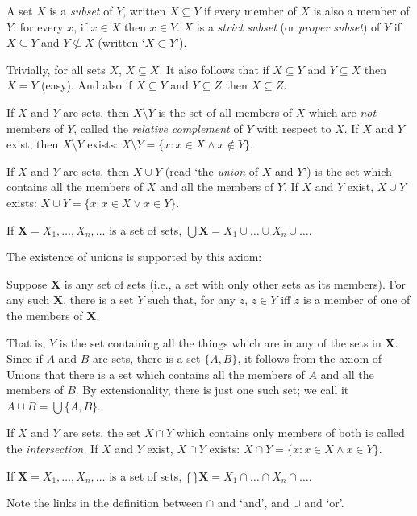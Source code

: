 \begin{definition}[Subset] A set $X$ is a {\em subset} of $Y$, written
   $X \subseteq Y$ if every
    member of $X$ is also a member of $Y$: for every $x$, if $x \in X$
    then $x \in Y$. $X$ is a {\em strict subset} (or {\em proper
    subset}) of $Y$ if $X
    \subseteq Y$ and $Y \not\subseteq X$ (written `$X \subset
Y$').\end{definition}
Trivially, for all sets $X$, $X\subseteq X$. It also follows that if $X \subseteq Y$ and $Y \subseteq X$ then $X=Y$ (easy). And also if $X \subseteq Y$ and $Y \subseteq Z$ then $X \subseteq Z$.
\begin{definition} If $X$ and $Y$
	are sets, then $X \setminus Y$ is the set of all members of $X$ which
	are {\em not} members of $Y$, called the {\em relative complement} of
	$Y$ with respect to $X$. If $X$ and $Y$ exist, then $X\setminus Y$ exists: $X \setminus Y = \{x: x\in X \wedge x \notin Y\}$.\end{definition}
\begin{definition}[Union] If $X$ and $Y$ are sets, then $X \cup Y$
    (read `the {\em union} of $X$ and $Y$') is the set which contains 
    all the
    members of $X$ and all the members of $Y$. If $X$ and $Y$ exist, $X\cup Y$ exists: $X \cup Y = \{x:x\in X \vee x \in Y\}$. 

If $\mathbf{X}=X_{1},\ldots,X_{n},\ldots$ is a set of sets, $\bigcup \mathbf{X} = X_{1} \cup \ldots \cup X_{n} \cup \ldots$.
\end{definition}
The existence of unions is supported by this axiom: \begin{axiom}[Unions]
  Suppose $\mathbf{X}$ is any set of sets (i.e., a set with only other sets as its members). For any such $\mathbf{X}$, there is a set $Y$ such that, for any $z$, $z\in Y$ iff $z$ is a member of one of the members of $\mathbf{X}$.  
\end{axiom} That is, $Y$ is the set containing all the things which are in any of the sets in $\mathbf{X}$. Since if $A$ and $B$ are sets, there is a set $\{A,B\}$, it follows from the axiom of Unions that there is a set which contains all the members of $A$ and all the members of $B$. By extensionality, there is just one such set; we call it $A \cup B = \bigcup\{A,B\}$.


\begin{definition}[Intersection] If $X$ and $Y$ are sets, the set $X
    \cap Y$ which contains only members of both is called the {\em
    intersection.} If $X$ and $Y$ exist, $X \cap Y$ exists: $X\cap Y = \{x:x\in X \wedge x\in Y\}$.

If $\mathbf{X}=X_{1},\ldots,X_{n},\ldots$ is a set of sets, $\bigcap \mathbf{X} = X_{1} \cap \ldots \cap X_{n} \cap \ldots$.
\end{definition}
Note the links in the definition between $\cap$ and `and', and $\cup$ and `or'.
 

